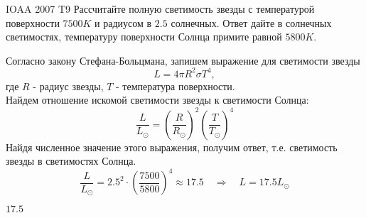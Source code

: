 \usepackage{preamble}


\begin{problem}{IOAA 2007 T9} 
	Рассчитайте полную светимость звезды с температурой поверхности $7500K$ и радиусом в $2.5$ солнечных. Ответ дайте в солнечных светимостях, температуру поверхности Солнца примите равной $5800K$.

\begin{solution}
	Согласно закону Стефана-Больцмана, запишем выражение для светимости звезды
    \begin{equation}
        L=4\pi R^2\sigma T^4,
    \end{equation}
    где $R$ - радиус звезды, $T$ - температура поверхности.\\
    Найдем отношение искомой светимости звезды к светимости Солнца:
    \begin{equation}
        \frac{L}{L_{\odot}}=\left(\frac{R}{R_{\odot}}\right)^2\left(\frac{T}{T_{\odot}}\right)^4
    \end{equation}
    Найдя численное значение этого выражения, получим ответ, т.е. светимость звезды в светимостях Солнца.
    \begin{equation}
        \frac{L}{L_{\odot}}=2.5^2\cdot\left(\frac{7500}{5800}\right)^4\approx17.5
        \quad\Longrightarrow\quad
        L=17.5L_{\odot}
    \end{equation}
\end{solution}

\begin{answer}
	$17.5$
\end{answer}
\end{problem}
